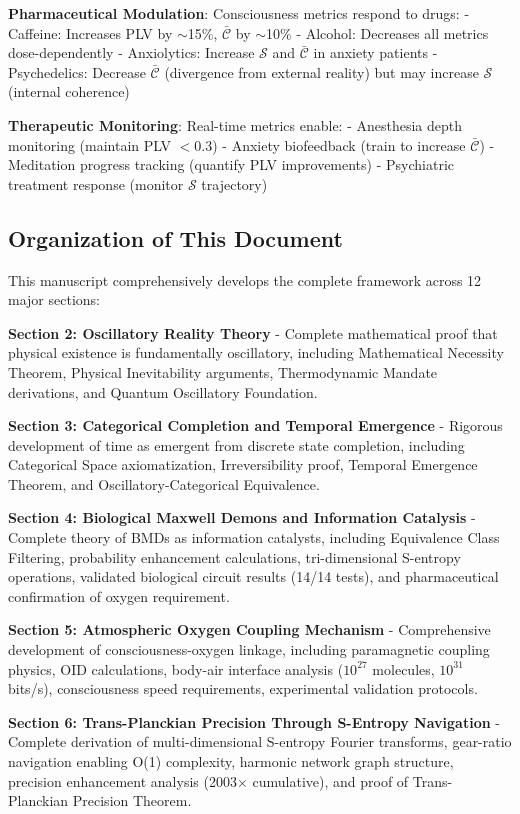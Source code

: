 \documentclass[11pt,onecolumn]{article}
\begin{document}
\textbf{Pharmaceutical Modulation}: Consciousness metrics respond to drugs:
- Caffeine: Increases PLV by $\sim$15\%, $\bar{\mathcal{C}}$ by $\sim$10\%
- Alcohol: Decreases all metrics dose-dependently
- Anxiolytics: Increase $\mathcal{S}$ and $\bar{\mathcal{C}}$ in anxiety patients
- Psychedelics: Decrease $\bar{\mathcal{C}}$ (divergence from external reality) but may increase $\mathcal{S}$ (internal coherence)

\textbf{Therapeutic Monitoring}: Real-time metrics enable:
- Anesthesia depth monitoring (maintain PLV $< 0.3$)
- Anxiety biofeedback (train to increase $\bar{\mathcal{C}}$)
- Meditation progress tracking (quantify PLV improvements)
- Psychiatric treatment response (monitor $\mathcal{S}$ trajectory)

\subsection{Organization of This Document}

This manuscript comprehensively develops the complete framework across 12 major sections:

\textbf{Section 2: Oscillatory Reality Theory} - Complete mathematical proof that physical existence is fundamentally oscillatory, including Mathematical Necessity Theorem, Physical Inevitability arguments, Thermodynamic Mandate derivations, and Quantum Oscillatory Foundation.

\textbf{Section 3: Categorical Completion and Temporal Emergence} - Rigorous development of time as emergent from discrete state completion, including Categorical Space axiomatization, Irreversibility proof, Temporal Emergence Theorem, and Oscillatory-Categorical Equivalence.

\textbf{Section 4: Biological Maxwell Demons and Information Catalysis} - Complete theory of BMDs as information catalysts, including Equivalence Class Filtering, probability enhancement calculations, tri-dimensional S-entropy operations, validated biological circuit results (14/14 tests), and pharmaceutical confirmation of oxygen requirement.

\textbf{Section 5: Atmospheric Oxygen Coupling Mechanism} - Comprehensive development of consciousness-oxygen linkage, including paramagnetic coupling physics, OID calculations, body-air interface analysis ($10^{27}$ molecules, $10^{31}$ bits/s), consciousness speed requirements, experimental validation protocols.

\textbf{Section 6: Trans-Planckian Precision Through S-Entropy Navigation} - Complete derivation of multi-dimensional S-entropy Fourier transforms, gear-ratio navigation enabling O(1) complexity, harmonic network graph structure, precision enhancement analysis (2003$\times$ cumulative), and proof of Trans-Planckian Precision Theorem.
\end{document}
